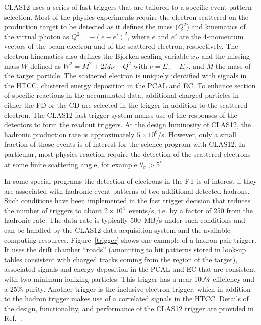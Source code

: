 \documentclass[final,3p,twocolumn]{elsarticle}
\begin{document}
CLAS12 uses a series of fast triggers that are tailored to a specific event pattern selection. Most of the physics
experiments require the electron scattered on the production target to be detected as it defines the mass
($Q^2$) and kinematics of the virtual photon as $Q^2 = -(e - e')^2$, where $e$ and $e'$ are the 4-momentum
vectors of the beam electron and of the scattered electron, respectively. The electron kinematics also defines
the Bjorken scaling variable $x_B$  and the missing mass $W$ defined as $W^2 = M^2 + 2M\nu - Q^2$ with
$\nu = E_e - E_{e'}$, and $M$ the mass of the target particle. The scattered electron is uniquely identified with
signals in the HTCC, clustered energy deposition  in the PCAL and EC. To enhance section of specific reactions 
in the accumulated data, additional charged particles
in either the FD or the CD are selected in the trigger in addition to the scattered electron. The CLAS12 fast
trigger system makes use of the responses of the detectors to form the readout triggers. At the design
luminosity of CLAS12, the hadronic production rate is approximately $5 \times 10^6$/s. However, only a small
fraction of those events is of interest for the science program with CLAS12. In particular, most physics reaction
require the detection of the scattered electrons at some finite scattering angle, for example $\theta_{e'} > 5^\circ$.  
   
   

In some special programs the detection of electrons in the FT is of interest if they are associated with hadronic
event patterns of two additional detected hadrons. Such conditions have been implemented in the fast trigger
decision that reduces the number of triggers to about $2 \times 10^4$~events/s, i.e. by  a factor of 250 from the
hadronic rate. The data rate is typically 500~MB/s under such conditions and can be handled by the CLAS12 data
acquisition system and the available computing resources. Figure~\ref{trigger} shows one example of a hadron pair
trigger. It uses the drift chamber ``roads'' (amounting to hit patterns stored in look-up tables consistent with
charged tracks coming from the region of the target), associated signals and energy deposition in the
PCAL and EC that are consistent with two minimum ionizing particles. This trigger has a near 100\% efficiency and a
25\% purity. Another trigger is the inclusive electron trigger, which in addition to the hadron trigger makes use of
a correlated signals in the HTCC. Details of the design, functionality, and performance of the CLAS12 trigger are
provided in Ref.~\cite{TRIG}. 
\end{document}
